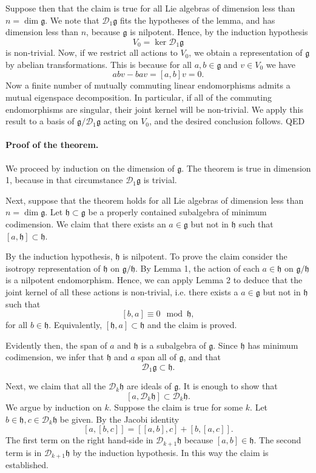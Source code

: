 \documentclass[12pt]{article}
\newcommand{\lag}{\mathfrak{g}}
\newcommand{\lah}{\mathfrak{h}}
\newcommand{\cD}{\mathcal{D}}
\begin{document}
Suppose then that the claim is true for all Lie algebras of dimension
less than $n=\dim\lag$. We note that $\cD_1\lag$ fits the hypotheses
of the lemma, and has dimension less than $n$, because $\lag$ is
nilpotent. Hence, by the induction hypothesis
$$V_0 = \ker \cD_1\lag$$
is non-trivial.  Now, if we restrict all
actions to $V_0$, we obtain a representation of $\lag$ by abelian
transformations. This is because for all $a,b\in\lag$ and $v\in V_0$
we have
$$a b v-b a v = [a,b]v = 0 .$$
Now a finite number of mutually
commuting linear endomorphisms admits a mutual eigenspace
decomposition.  In particular, if all of the commuting endomorphisms
are singular, their joint kernel will be non-trivial.  We apply
this result to a basis of $\lag/\cD_1\lag$ acting on $V_0$,
and the desired conclusion follows.  QED


\paragraph{Proof of the theorem.}

We proceed by induction on the dimension of $\lag$.  The theorem is
true in dimension 1, because in that circumstance $\cD_1\lag$ is
trivial.  

Next, suppose that the theorem holds for all Lie algebras of dimension
less than $n=\dim\lag$. Let $\lah\subset\lag$ be a properly contained
subalgebra of minimum codimension. We claim that there exists an
$a\in\lag$ but not in $\lah$ such that $[a,\lah]\subset\lah$.

By the induction hypothesis, $\lah$ is nilpotent. To prove the claim
consider the isotropy representation of $\lah$ on $\lag/\lah$.  By
Lemma 1, the action of each $a\in\lah$ on $\lag/\lah$ is a nilpotent
endomorphism.  Hence, we can apply Lemma 2 to deduce that the joint
kernel of all these actions is non-trivial, i.e. there exists a
$a\in\lag$ but not in $\lah$ such that
$$[b,a]\equiv 0 \mod \lah,$$
for all $b\in\lah$. Equivalently, $[\lah,a]\subset \lah$ and the claim
is proved.

Evidently then, the span of $a$ and $\lah$ is a subalgebra of $\lag$.
Since $\lah$ has minimum codimension, we infer that $\lah$ and $a$
span all of $\lag$, and that 
\begin{equation}
  \label{eq:g1inh}
  \cD_1\lag\subset\lah.  
\end{equation}

Next, we claim that all the $\cD_k\lah$ are ideals of $\lag$.  It is
enough to show that
$$[a,\cD_k\lah]\subset \cD_k\lah.$$
We argue by induction on $k$. Suppose the
claim is true for some $k$. Let $b\in\lah, c\in\cD_k\lah$ be given. By
the Jacobi identity
$$[a,[b,c]] = [[a,b],c] + [b,[a,c]].$$
The first term on the right hand-side in $\cD_{k+1}\lah$ because
$[a,b]\in\lah$.  The second term is in $\cD_{k+1}\lah$ by the induction
hypothesis.  In this way the claim is established.
\end{document}
